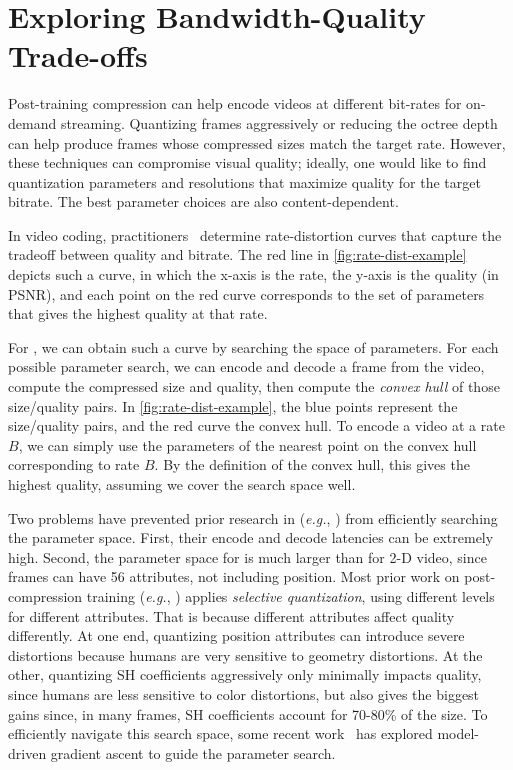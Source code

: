 \section{Exploring \dgs{} Bandwidth-Quality Trade-offs}\label{sec:bandw-adapt}

Post-training compression can help encode \dgs{} videos at different bit-rates for on-demand streaming.
%
Quantizing \dgs{} frames aggressively or reducing the octree depth can help produce frames whose compressed sizes match the target rate.
%
However, these techniques can compromise visual quality; ideally, one would like to find quantization parameters and resolutions that maximize quality for the target bitrate.
%
The best parameter choices are also content-dependent.

%
In video coding, practitioners~\cite{netflix_rdo} determine rate-distortion curves that capture the tradeoff between quality and bitrate.
%
The red line in \cref{fig:rate-dist-example} depicts such a curve, in which the x-axis is the rate, the y-axis is the quality (in PSNR), and each point on the red curve corresponds to the set of parameters that gives the highest quality at that rate.

For \dgs{}, we can obtain such a curve by searching the space of parameters.
%
For each possible parameter search, we can encode and decode a \gs{} frame from the video, compute the compressed size and quality, then compute the \textit{convex hull} of those size/quality pairs.
%
In \cref{fig:rate-dist-example}, the blue points represent the size/quality pairs, and the red curve the convex hull.
%
To encode a video at a rate $B$, we can simply use the parameters of the nearest point on the convex hull corresponding to rate $B$.
%
By the definition of the convex hull, this gives the highest quality, assuming we cover the search space well.

Two problems have prevented prior research in \dgs{} (\textit{e.g.}, \cite{gpcc-adaptive,queen}) from efficiently searching the parameter space.
%
First, their encode and decode latencies can be extremely high.
%
Second, the parameter space for \dgs{} is much larger than for 2-D video, since \gs{} frames can have 56 attributes, not including position.
%
Most prior work on post-compression training (\textit{e.g.}, \cite{mesongs}) applies \textit{selective quantization}, using different levels for different attributes.
%
That is because different attributes affect quality differently.
%
At one end, quantizing position attributes can introduce severe distortions because humans are very sensitive to geometry distortions.
%
At the other, quantizing SH coefficients aggressively only minimally impacts quality, since humans are less sensitive to color distortions, but also gives the biggest gains since, in many \gs{} frames, SH coefficients account for 70-80\% of the size.
%
To efficiently navigate this search space, some recent work~\cite{mga} has explored model-driven gradient ascent to guide the parameter search.

